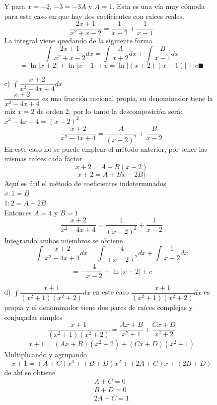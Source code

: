 \documentclass[10pt,twoside]{SelfArx} %
\begin{document}
\begin{enumerate}
\begin{enumerate}
\begin{enumerate}
Y para $ x=-2 $, $ -3=-3A $ y $ A=1 $. Esta es una vía muy cómoda para este caso en que hay dos coeficientes con raíces reales.
\[ \dfrac{2x+1}{x^{2}+x-2}=\dfrac{1}{x+2}+\dfrac{1}{x-1} \]
La integral viene quedando de la siguiente forma
\begin{equation}
\int\dfrac{2x+1}{x^{2}+x-2}dx=\int\dfrac{A}{x+2}dx+\int\dfrac{B}{x-1} dx
\end{equation}
\begin{equation}
=\ln|x+2|+\ln|x-1|+c=\ln|(x+2)(x-1)|+c\blacksquare
\end{equation}
\item [c)]$ \displaystyle\int\dfrac{x+2}{x^{2}-4x+4}dx $\\
$ \dfrac{x+2}{x^{2}-4x+4} $ es una fracción racional propia, su denominador tiene la raíz $ x=2 $ de orden $ 2 $,  por lo tanto la descomposición será: $ x^{2}-4x+4=(x-2)^{2} $
\begin{equation}
\dfrac{x+2}{x^{2}-4x+4}=\dfrac{A}{(x-2)^{2}}+\dfrac{B}{x-2}
\end{equation}
En este caso no se puede emplear el método anterior, por tener las mismas ra\'ices cada factor
\[ x+2=A+B(x-2) \]
\[ x+2=A+Bx-2B) \]
Aquí es útil el método de coeficientes indeterminados\\
$ x: 1=B $\\
$ 1:2=A-2B $\\
Entonces $ A=4 $ y $ B=1 $
\begin{equation}
\dfrac{x+2}{x^{2}-4x+4}=\dfrac{4}{(x-2)^{2}}+\dfrac{1}{x-2}
\end{equation}
Integrando ambos miembros se obtiene
\begin{equation}
\int\dfrac{x+2}{x^{2}-4x+4}dx=\int\dfrac{4}{(x-2)^{2}}dx+\int\dfrac{1}{x-2}dx
\end{equation}
\begin{equation}
=-\dfrac{4}{x-2}+\ln|x-2|+c
\end{equation}
\item [d)]$ \int \dfrac{x+1}{(x^{2}+1)(x^{2}+2)}dx $
en este caso $ \dfrac{x+1}{(x^{2}+1)(x^{2}+2)}dx $ es propia y el denominador tiene dos pares de ra\'ices complejas y conjugadas simples
\[ \dfrac{x+1}{(x^{2}+1)(x^{2}+2)}=\dfrac{Ax+B}{x^{2}+1}+\dfrac{Cx+D}{x^{2}+2} \]
\[ x+1=(Ax+B)(x^{2}+2)+(Cx+D)(x^{2}+1) \]
Multiplicando y agrupando
\[ x+1=(A+C)x^{3}+(B+D)x^{2}+(2A+C)x+(2B+D) \]
de ahí se obtiene
\[ 
\begin{array}{cccc}
A+C=0\\
B+D=0\\
2A+C=1\\

\end{array}\]
\end{enumerate}
\end{enumerate}
\end{enumerate}
\end{document}
